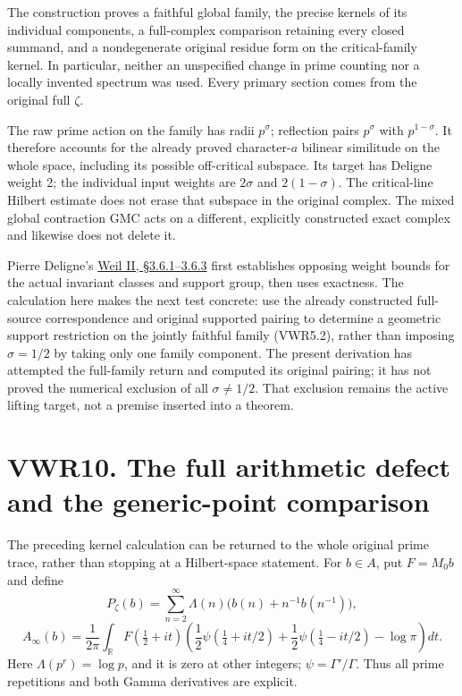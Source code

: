 The construction proves a faithful global family, the precise kernels of
its individual components, a full-complex comparison retaining every
closed summand, and a nondegenerate original residue form on the
critical-family kernel. In particular, neither an unspecified change in
prime counting nor a locally invented spectrum was used. Every primary
section comes from the original full \(\zeta\).

The raw prime action on the family has radii \(p^\sigma\); reflection
pairs \(p^\sigma\) with \(p^{1-\sigma}\). It therefore accounts for the
already proved character-\(a\) bilinear similitude on the whole space,
including its possible off-critical subspace. Its target has Deligne
weight 2; the individual input weights are \(2\sigma\) and
\(2(1-\sigma)\). The critical-line Hilbert estimate does not erase that
subspace in the original complex. The mixed global contraction GMC acts
on a different, explicitly constructed exact complex and likewise does
not delete it.

Pierre Deligne's
\href{https://www.numdam.org/item/PMIHES_1980__52__137_0/}{Weil II,
§3.6.1--3.6.3} first establishes opposing weight bounds for the actual
invariant classes and support group, then uses exactness. The
calculation here makes the next test concrete: use the already
constructed full-source correspondence and original supported pairing to
determine a geometric support restriction on the jointly faithful family
(VWR5.2), rather than imposing \(\sigma=1/2\) by taking only one family
component. The present derivation has attempted the full-family return
and computed its original pairing; it has not proved the numerical
exclusion of all \(\sigma\ne1/2\). That exclusion remains the active
lifting target, not a premise inserted into a theorem.

\section{VWR10. The full arithmetic defect and the generic-point
comparison}\label{vwr10.-the-full-arithmetic-defect-and-the-generic-point-comparison}

The preceding kernel calculation can be returned to the whole original
prime trace, rather than stopping at a Hilbert-space statement. For
\(b\in A\), put \(F=M_0b\) and define \[
P_\zeta(b)=\sum_{n=2}^{\infty}\Lambda(n)
 \bigl(b(n)+n^{-1}b(n^{-1})\bigr),
\] \[
A_\infty(b)=\frac1{2\pi}\int_{\mathbb R}F(\tfrac12+it)
 \left(\frac12\psi(\tfrac14+it/2)+\frac12\psi(\tfrac14-it/2)-\log\pi\right)dt.
\tag{VWR10.1}
\] Here \(\Lambda(p^r)=\log p\), and it is zero at other integers;
\(\psi=\Gamma'/\Gamma\). Thus all prime repetitions and both Gamma
derivatives are explicit.

